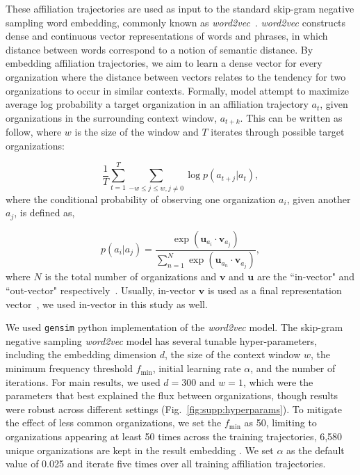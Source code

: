 \documentclass[12pt]{article} %
\begin{document}
These affiliation trajectories are used as input to the standard skip-gram negative sampling word embedding, commonly known as \textit{word2vec}~\autocite{mikolov2013word2vec}.
\textit{word2vec} constructs dense and continuous vector representations of words and phrases, in which distance between words correspond to a notion of semantic distance. By embedding affiliation trajectories, we aim to learn a dense vector for every organization where the distance between vectors relates to the tendency for two organizations to occur in similar contexts.
Formally, model attempt to maximize average log probability a target organization  in an affiliation trajectory $a_{t}$, given organizations in the surrounding context window, $a_{t+k}$. This can be written as follow, where $w$ is the size of the window and $T$ iterates through possible target organizations:

%
%
$$
\frac{1}{T}\sum_{t = 1}^{T} \sum_{-w \leq j \leq w, j \neq 0} \log p(a_{t + j} \vert a_{t}),
$$
where the conditional probability of observing one organization $a_{i}$, given another $a_{j}$, is defined as, 

%
%
$$
p(a_{i} \vert a_{j}) = \frac{\exp(\bm{u}_{a_{i}} \cdot \bm{v}_{a_{j}})}{\sum_{n=1}^N \exp(\bm{u}_{a_{n}} \cdot \bm{v}_{a_{j}})},
$$
where $N$ is the total number of organizations and $\bm{v}$ and $\bm{u}$ are the ``in-vector" and ``out-vector" respectively~\autocite{mikolov2013word2vec}. Usually, in-vector $\bm{v}$ is used as a final representation vector~\autocite{linzhuo2020hyperbolic, tshitoyan2019mat2vec, garg2018gender, kozlowski2018geometry, hamilton2016diachronic, le2014doc2vec, nakandala2016twitch}, we used in-vector in this study as well.

We used  \texttt{gensim} python implementation of the \textit{word2vec} model. The skip-gram negative sampling  \textit{word2vec} model has several tunable hyper-parameters, including the embedding dimension $d$, the size of the context window $w$, the minimum frequency threshold $f_{\min}$, initial learning rate $\alpha$, and the number of iterations.
For main results, we used $d=300$ and $w=1$, which were the parameters that best explained the flux between organizations, though results were robust across different settings (Fig.~\ref{fig:supp:hyperparams}).
To mitigate the effect of less common organizations, we set the $f_{\min}$ as 50, limiting to organizations appearing at least 50 times across the training trajectories,  6,580 unique organizations are kept in the result embedding .
We set $\alpha$ as the default value of 0.025 and iterate five times over all training affiliation trajectories.
\end{document}

